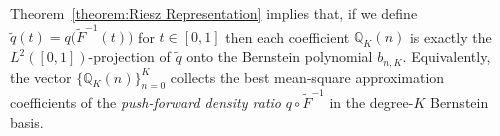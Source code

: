 \documentclass{article}
\begin{document}





Theorem~\ref{theorem:Riesz Representation} implies that, if we define $\tilde{q}(t) = q\bigl(\tilde F^{-1}(t)\bigr)$ for $t\in[0,1]$ then each coefficient $\mathbb Q_K(n)$ is exactly the \(L^2([0,1])\)-projection of \(\tilde{q}\) onto the Bernstein polynomial \(b_{n,K}\).  Equivalently, the vector $\{\mathbb{Q}_K(n)\}_{n=0}^{K}$ collects the best mean‐square approximation coefficients of the  \emph{push-forward density ratio} \(q\circ\tilde F^{-1}\) in the degree-\(K\) Bernstein basis.

\end{document}
